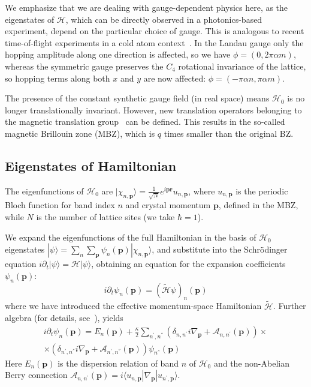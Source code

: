 \documentclass[twocolumn, 10pt, aps, superscriptaddress, floatfix, showpacs, pra, citeautoscript]{revtex4-1}
\newcommand{\vt}[1]{\mathbf{#1}}
\newcommand{\bra}[1]{\langle #1|}
\newcommand{\ket}[1]{|#1\rangle}
\begin{document}
We emphasize that we are dealing with gauge-dependent physics here, as
the eigenstates of $\mathcal{H}$, which can be directly observed in a
photonics-based experiment, depend on the particular choice of
gauge. This is analogous to recent time-of-flight experiments in a
cold atom context~\cite{kennedy2015bec,spielman2011gauge}.
%
In the Landau gauge only the hopping amplitude along one direction is
affected, so we have $\phi = (0, 2\pi\alpha m)$, whereas the symmetric
gauge preserves the $C_4$ rotational invariance of the lattice, so hopping
terms along both $x$ and $y$ are now affected:
$\phi = (-\pi\alpha n, \pi\alpha m)$.

The presence of the constant synthetic gauge field (in real space)
means $\mathcal{H}_0$ is no longer translationally invariant. However,
new translation operators belonging to the magnetic translation
group~\cite{zak1964group, zak1964representations} can be defined. This
results in the so-called magnetic Brillouin zone (MBZ), which is $q$
times smaller than the original BZ.

\subsection{Eigenstates of Hamiltonian}\label{sec:eigenstates}

The eigenfunctions of $\mathcal{H}_0$ are
$\ket{\chi_{n,\vt{p}}} = \frac{1}{\sqrt{N}} e^{i\vt{p}\vt{r}}
u_{n,\vt{p}}$,
where $u_{n,\vt{p}}$ is the periodic Bloch function for band index $n$
and crystal momentum $\vt{p}$, defined in the MBZ, while $N$ is the
number of lattice sites (we take $\hbar = 1$).

We expand the eigenfunctions of the full Hamiltonian in the basis of
$\mathcal{H}_0$ eigenstates
$\ket{\psi} = \sum_n\sum_{\vt{p}} \psi_n(\vt{p})
\ket{\chi_{n,\vt{p}}}$,
and substitute into the Schr\"{o}dinger equation
$i \partial_t \ket{\psi} = \mathcal{H} \ket{\psi}$, obtaining an
equation for the expansion coefficients $\psi_n(\vt{p})$:
\begin{equation}
  i \partial_t \psi_n(\vt{p}) = (\widetilde{\mathcal{H}} \psi)_n(\vt{p})
\end{equation}
where we have introduced the effective momentum-space Hamiltonian
$\widetilde{\mathcal{H}}$. Further algebra (for details,
see~\cite{price2014magnetic}), yields
%
\begin{multline}
  i \partial_t \psi_n(\vt{p}) = E_n(\vt{p}) + \frac{\kappa}{2}\sum_{n^{'},n^{''}}\left(\delta_{n,n^{'}}i \nabla_{\vt{p}} + \mathcal{A}_{n,n^{'}}(\vt{p})\right)\times \\ \times \left(\delta_{n^{'},n^{''}}i\nabla_{\vt{p}} + \mathcal{A}_{n^{'},n^{''}}(\vt{p})\right) \psi_{n^{''}}(\vt{p})
\end{multline}
Here $E_n(\vt{p})$ is the dispersion relation of band $n$ of $\mathcal{H}_0$ and the non-Abelian Berry connection $\mathcal{A}_{n,n^{'}}(\vt{p}) = i\bra{u_{n,\vt{p}}}\nabla_{\vt{p}}\ket{u_{n^{'},\vt{p}}}$. 
\end{document}
